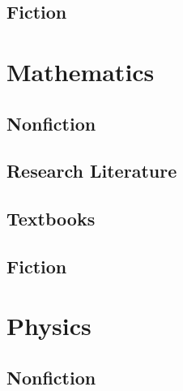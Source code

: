 \documentclass[10pt]{article}
\begin{document}
\subsection{Fiction}

\section{Mathematics}
\subsection{Nonfiction}
\subsection{Research Literature}
\subsection{Textbooks}
\subsection{Fiction}


\section{Physics}
\subsection{Nonfiction}
\end{document}
